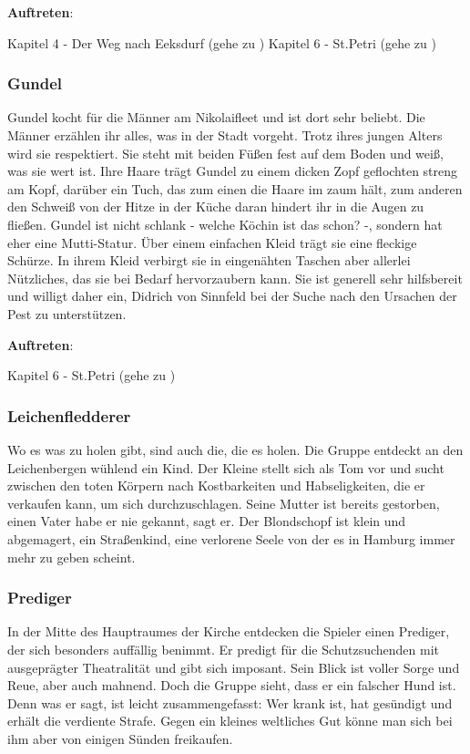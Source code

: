 \textbf{Auftreten}:

Kapitel 4 - Der Weg nach Eeksdurf (gehe zu \blue{\ref{nachxd}})
Kapitel 6 - St.Petri (gehe zu \blue{\ref{Petri}})

\subsubsection*{Gundel}
\label{Gundel}

Gundel kocht für die Männer am Nikolaifleet und ist dort sehr beliebt. Die Männer erzählen ihr alles, was in der Stadt vorgeht. Trotz ihres jungen Alters wird sie respektiert. Sie steht mit beiden Füßen fest auf dem Boden und weiß, was sie wert ist. Ihre Haare trägt Gundel zu einem dicken Zopf geflochten streng am Kopf, darüber ein Tuch, das zum einen die Haare im zaum hält, zum anderen den Schweiß von der Hitze in der Küche daran hindert ihr in die Augen zu fließen. Gundel ist nicht schlank - welche Köchin ist das schon? -, sondern hat eher eine Mutti-Statur. Über einem einfachen Kleid trägt sie eine fleckige Schürze. In ihrem Kleid verbirgt sie in eingenähten Taschen aber allerlei Nützliches, das sie bei Bedarf hervorzaubern kann. Sie ist generell sehr hilfsbereit und willigt daher ein, Didrich von Sinnfeld bei der Suche nach den Ursachen der Pest zu unterstützen.

\textbf{Auftreten}:

Kapitel 6 - St.Petri (gehe zu \blue{\ref{hinten}})

\subsubsection*{Leichenfledderer}
\label{Leichenfledderer}

Wo es was zu holen gibt, sind auch die, die es holen. Die Gruppe entdeckt an den Leichenbergen wühlend ein Kind. Der Kleine stellt sich als Tom vor und sucht zwischen den toten Körpern nach Kostbarkeiten und Habseligkeiten, die er verkaufen kann, um sich durchzuschlagen. Seine Mutter ist bereits gestorben, einen Vater habe er nie gekannt, sagt er. Der Blondschopf ist klein und abgemagert, ein Straßenkind, eine verlorene Seele von der es in Hamburg immer mehr zu geben scheint.

\subsubsection*{Prediger}
\label{Prediger}

In der Mitte des Hauptraumes der Kirche entdecken die Spieler einen Prediger, der sich besonders auffällig benimmt. Er predigt für die Schutzsuchenden mit ausgeprägter Theatralität und gibt sich imposant. Sein Blick ist voller Sorge und Reue, aber auch mahnend. Doch die Gruppe sieht, dass er ein falscher Hund ist. Denn was er sagt, ist leicht zusammengefasst: Wer krank ist, hat gesündigt und erhält die verdiente Strafe. Gegen ein kleines weltliches Gut könne man sich bei ihm aber von einigen Sünden freikaufen.

